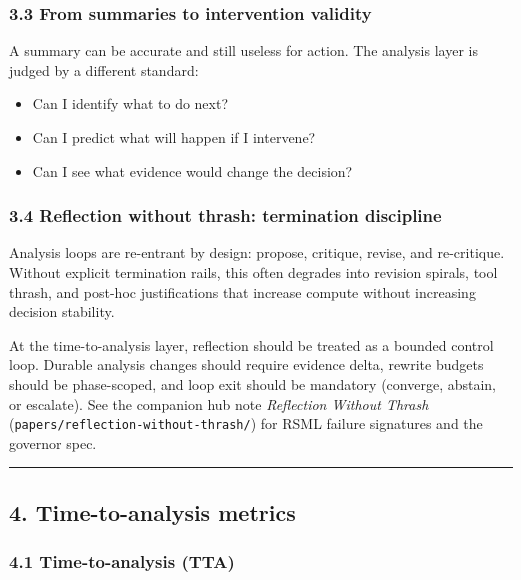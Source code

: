 \documentclass[11pt]{article}
\providecommand{\tightlist}{%
  \setlength{\itemsep}{0pt}\setlength{\parskip}{0pt}}
\begin{document}
\hypertarget{from-summaries-to-intervention-validity}{%
\subsubsection{3.3 From summaries to intervention
validity}\label{from-summaries-to-intervention-validity}}

A summary can be accurate and still useless for action. The analysis
layer is judged by a different standard:

\begin{itemize}
\tightlist
\item
  Can I identify what to do next?
\item
  Can I predict what will happen if I intervene?
\item
  Can I see what evidence would change the decision?
\end{itemize}

\hypertarget{reflection-termination-discipline}{%
\subsubsection{3.4 Reflection without thrash: termination discipline}\label{reflection-termination-discipline}}

Analysis loops are re-entrant by design: propose, critique, revise, and re-critique. Without explicit termination rails, this often degrades into revision spirals, tool thrash, and post-hoc justifications that increase compute without increasing decision stability.

At the time-to-analysis layer, reflection should be treated as a bounded control loop. Durable analysis changes should require evidence delta, rewrite budgets should be phase-scoped, and loop exit should be mandatory (converge, abstain, or escalate). See the companion hub note \emph{Reflection Without Thrash} (\texttt{papers/reflection-without-thrash/}) for RSML failure signatures and the governor spec.

\begin{center}\rule{0.5\linewidth}{0.5pt}\end{center}

\hypertarget{time-to-analysis-metrics}{%
\subsection{4. Time-to-analysis
metrics}\label{time-to-analysis-metrics}}

\hypertarget{time-to-analysis-tta}{%
\subsubsection{4.1 Time-to-analysis (TTA)}\label{time-to-analysis-tta}}
\end{document}

